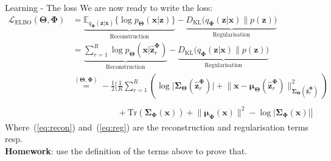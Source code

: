 \documentclass{beamer}
\newcommand{\bs}[1]{\boldsymbol{#1}}
\begin{document}
\begin{frame}{Learning - The loss}
We are now ready to write the loss:
\begin{align}
 \mathcal{L}_{\text{ELBO}}(\bs{\Theta},\bs{\Phi}) &= \underbrace{\mathbb{E}_{q_{\bs{\Phi}}(\bs{z}|\bs{x})}\Big\{\log p_{\bs{\Theta}}(\bs{x}|\bs{z})\Big\}}_{\text{Reconstruction}} -  \underbrace{D_{\text{KL}}\Big(q_{\bs{\Phi}}(\bs{z}|\bs{x})\Big\lVert p(\bs{z})\Big)}_{\text{Regularisation}}\\
 &= \underbrace{\sum_{r=1}^R\log p_{\bs{\Theta}}(\bs{x}|\hat{\bs{z}}_r^{\bs{\Phi}})}_{\text{Reconstruction}} -  \underbrace{D_{\text{KL}}\Big(q_{\bs{\Phi}}(\bs{z}|\bs{x})\Big\lVert p(\bs{z})\Big)}_{\text{Regularisation}} \\
 &\stackrel{(\bs{\Theta},\bs{\Phi})}{=} -\frac{1}{2}\Bigg[\frac{1}{R}\sum_{r=1}^R \left(\log \lvert \bs{\Sigma}_{\bs{\Theta}}(\hat{\bs{z}}_r^{\bs{\Phi}})\rvert + \lVert \bs{x}-\bs{\mu}_{\bs{\Theta}}(\hat{\bs{z}}_r^{\bs{\Phi}})\rVert^2_{\bs{\Sigma}_{\bs{\Theta}}(\hat{\bs{z}}_r^{\bs{\Phi}})} \right)\label{eq:recon}\\
 &\phantom{\stackrel{(\bs{\Theta},\bs{\Phi})}{=} -\frac{1}{2}\Bigg[}+\textrm{Tr}(\bs{\Sigma}_{\bs{\Phi}}(\bs{x})) + \lVert\bs{\mu}_{\bs{\Phi}}(\bs{x})\rVert^2 - \log \lvert\bs{\Sigma}_{\bs{\Phi}}(\bs{x})\rvert\Bigg]\label{eq:reg}
\end{align}
Where~(\ref{eq:recon}) and~(\ref{eq:reg}) are the reconstruction and regularisation terms resp.\\
\textbf{Homework}: use the definition of the terms above to prove that.
\end{frame}
\end{document}
